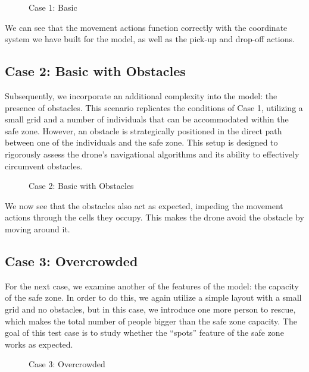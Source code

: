 \documentclass{article}
\begin{document}
\begin{figure}[ht]
    \centering
    \caption{Case 1: Basic}
    \label{fig:initial-state}
\end{figure}
\FloatBarrier

We can see that the movement actions function correctly with the coordinate system we have built for the model, as well as the pick-up and drop-off actions.

\subsection{Case 2: Basic with Obstacles}

Subsequently, we incorporate an additional complexity into the model: the presence of obstacles. This scenario replicates the conditions of Case 1, utilizing a small grid and a number of individuals that can be accommodated within the safe zone. However, an obstacle is strategically positioned in the direct path between one of the individuals and the safe zone. This setup is designed to rigorously assess the drone's navigational algorithms and its ability to effectively circumvent obstacles.

\begin{figure}[H]
    \centering
    \caption{Case 2: Basic with Obstacles}
    \label{fig:initial-state-obstacles}
\end{figure}
\FloatBarrier

We now see that the obstacles also act as expected, impeding the movement actions through the cells they occupy. This makes the drone avoid the obstacle by moving around it.

\subsection{Case 3: Overcrowded}

For the next case, we examine another of the features of the model: the capacity of the safe zone. In order to do this, we again utilize a simple layout with a small grid and no obstacles, but in this case, we introduce one more person to rescue, which makes the total number of people bigger than the safe zone capacity. The goal of this test case is to study whether the “spots” feature of the safe zone works as expected.

\begin{figure}[H]
    \centering
    \caption{Case 3: Overcrowded}
    \label{fig:initial-state-overcrowded}
\end{figure}
\FloatBarrier
\end{document}
